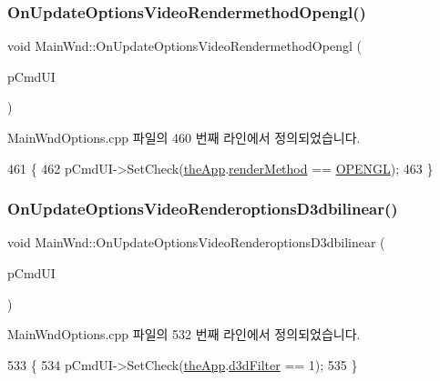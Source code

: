 \subsubsection{\texorpdfstring{On\+Update\+Options\+Video\+Rendermethod\+Opengl()}{OnUpdateOptionsVideoRendermethodOpengl()}}
{\footnotesize\ttfamily void Main\+Wnd\+::\+On\+Update\+Options\+Video\+Rendermethod\+Opengl (\begin{DoxyParamCaption}\item[{C\+Cmd\+UI $\ast$}]{p\+Cmd\+UI }\end{DoxyParamCaption})\hspace{0.3cm}{\ttfamily [protected]}}



Main\+Wnd\+Options.\+cpp 파일의 460 번째 라인에서 정의되었습니다.


\begin{DoxyCode}
461 \{
462   pCmdUI->SetCheck(\mbox{\hyperlink{_v_b_a_8cpp_a8095a9d06b37a7efe3723f3218ad8fb3}{theApp}}.\mbox{\hyperlink{class_v_b_a_ae31026d8986a7658f3aaa46fba9de663}{renderMethod}} == \mbox{\hyperlink{_display_8h_aa50f63b0688d0250e0be64d8401d09a0a4cd6ad65d345a77065fda71b3751ec24}{OPENGL}});
463 \}
\end{DoxyCode}
\mbox{\label{class_main_wnd_a0e30aec4baedb265a010ea7a65c1cecb}} 
\subsubsection{\texorpdfstring{On\+Update\+Options\+Video\+Renderoptions\+D3dbilinear()}{OnUpdateOptionsVideoRenderoptionsD3dbilinear()}}
{\footnotesize\ttfamily void Main\+Wnd\+::\+On\+Update\+Options\+Video\+Renderoptions\+D3dbilinear (\begin{DoxyParamCaption}\item[{C\+Cmd\+UI $\ast$}]{p\+Cmd\+UI }\end{DoxyParamCaption})\hspace{0.3cm}{\ttfamily [protected]}}



Main\+Wnd\+Options.\+cpp 파일의 532 번째 라인에서 정의되었습니다.


\begin{DoxyCode}
533 \{
534   pCmdUI->SetCheck(\mbox{\hyperlink{_v_b_a_8cpp_a8095a9d06b37a7efe3723f3218ad8fb3}{theApp}}.\mbox{\hyperlink{class_v_b_a_a8563e53b73a28a011e656f6fc8a4e5ff}{d3dFilter}} == 1);
535 \}
\end{DoxyCode}
\mbox{\label{class_main_wnd_a09f3b77c773efa5548d4edbc23e2f1cb}} 
